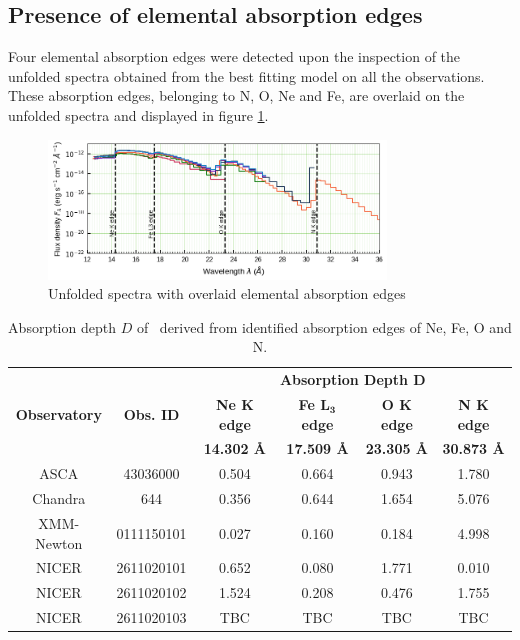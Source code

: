     \subsection{Presence of elemental absorption edges}
    Four elemental absorption edges were detected upon the inspection of the unfolded spectra obtained from the best fitting model on all the observations. These absorption edges, belonging to N, O, Ne and Fe, are overlaid on the unfolded spectra and displayed in figure \ref{fig:all-uf:abs-edges}.
    \begin{figure}[!htb]
        \centering
        \includegraphics[width=0.8\textwidth]{figures/eufspec/mr-vel-uf-ang_abs-edge.png}
        \caption{Unfolded spectra with overlaid elemental absorption edges}
        \label{fig:all-uf:abs-edges}
    \end{figure}
    
    \begin{table}[!htb]
    	\centering
    	\caption{Absorption depth $D$ of \source\ derived from identified absorption edges of Ne, Fe, O and N.}
    	\label{tab:abs-depth}
		\begin{tabular}{cccccc}
			\hline
			\multirow{3}{*}{\textbf{Observatory}} & \multirow{3}{*}{\textbf{Obs. ID}} & \multicolumn{4}{c}{\textbf{Absorption Depth $\boldsymbol{D}$}} \\ \cline{3-6} & & \textbf{Ne $\boldsymbol{K}$ edge} & \textbf{Fe $\boldsymbol{L_3}$ edge} & \textbf{O $\boldsymbol{K}$ edge} & \textbf{N $\boldsymbol{K}$ edge} \\ \cline{3-6} & & \textbf{14.302 \AA} & \textbf{17.509 \AA} & \textbf{23.305 \AA} & \textbf{30.873 \AA} \\
			\hline
			{ASCA} & {43036000} & {0.504} & {0.664} & {0.943} & {1.780} \\
			{Chandra} & {644} & {0.356} & {0.644} & {1.654} & {5.076} \\
			{XMM-Newton} & {0111150101} & {0.027} & {0.160} & {0.184} & {4.998} \\
			{NICER} & {2611020101} & {0.652} & {0.080} & {1.771} & {0.010} \\
			{NICER} & {2611020102} & {1.524} & {0.208} & {0.476} & {1.755} \\
			{NICER} & {2611020103} & {TBC} & {TBC} & {TBC} & {TBC} \\
			\hline
		\end{tabular}
	\end{table}

